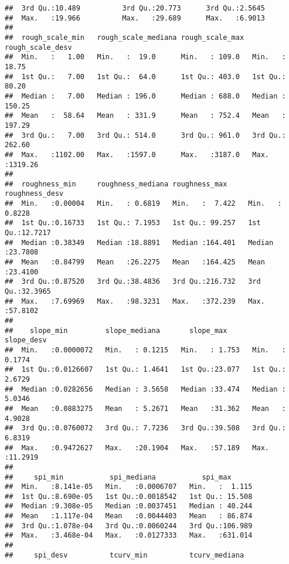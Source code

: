 \documentclass[11pt,]{article}
\begin{document}
\begin{verbatim}
##  3rd Qu.:10.489          3rd Qu.:20.773      3rd Qu.:2.5645      
##  Max.   :19.966          Max.   :29.689      Max.   :6.9013      
##                                                                  
##  rough_scale_min   rough_scale_mediana rough_scale_max  rough_scale_desv 
##  Min.   :   1.00   Min.   :  19.0      Min.   : 109.0   Min.   :  18.75  
##  1st Qu.:   7.00   1st Qu.:  64.0      1st Qu.: 403.0   1st Qu.:  80.20  
##  Median :   7.00   Median : 196.0      Median : 688.0   Median : 150.25  
##  Mean   :  58.64   Mean   : 331.9      Mean   : 752.4   Mean   : 197.29  
##  3rd Qu.:   7.00   3rd Qu.: 514.0      3rd Qu.: 961.0   3rd Qu.: 262.60  
##  Max.   :1102.00   Max.   :1597.0      Max.   :3187.0   Max.   :1319.26  
##                                                                          
##  roughness_min     roughness_mediana roughness_max     roughness_desv   
##  Min.   :0.00004   Min.   : 0.6819   Min.   :  7.422   Min.   : 0.8228  
##  1st Qu.:0.16733   1st Qu.: 7.1953   1st Qu.: 99.257   1st Qu.:12.7217  
##  Median :0.38349   Median :18.8891   Median :164.401   Median :23.7808  
##  Mean   :0.84799   Mean   :26.2275   Mean   :164.425   Mean   :23.4100  
##  3rd Qu.:0.87520   3rd Qu.:38.4836   3rd Qu.:216.732   3rd Qu.:32.3965  
##  Max.   :7.69969   Max.   :98.3231   Max.   :372.239   Max.   :57.8102  
##                                                                         
##    slope_min         slope_mediana       slope_max        slope_desv     
##  Min.   :0.0000072   Min.   : 0.1215   Min.   : 1.753   Min.   : 0.1774  
##  1st Qu.:0.0126607   1st Qu.: 1.4641   1st Qu.:23.077   1st Qu.: 2.6729  
##  Median :0.0282656   Median : 3.5658   Median :33.474   Median : 5.0346  
##  Mean   :0.0883275   Mean   : 5.2671   Mean   :31.362   Mean   : 4.9028  
##  3rd Qu.:0.0760072   3rd Qu.: 7.7236   3rd Qu.:39.508   3rd Qu.: 6.8319  
##  Max.   :0.9472627   Max.   :20.1904   Max.   :57.189   Max.   :11.2919  
##                                                                          
##     spi_min           spi_mediana           spi_max       
##  Min.   :8.141e-05   Min.   :0.0006707   Min.   :  1.115  
##  1st Qu.:8.690e-05   1st Qu.:0.0018542   1st Qu.: 15.508  
##  Median :9.308e-05   Median :0.0037451   Median : 40.244  
##  Mean   :1.117e-04   Mean   :0.0044403   Mean   : 86.874  
##  3rd Qu.:1.078e-04   3rd Qu.:0.0060244   3rd Qu.:106.989  
##  Max.   :3.468e-04   Max.   :0.0127333   Max.   :631.014  
##                                                           
##     spi_desv          tcurv_min          tcurv_mediana       

\end{verbatim}
\end{document}

